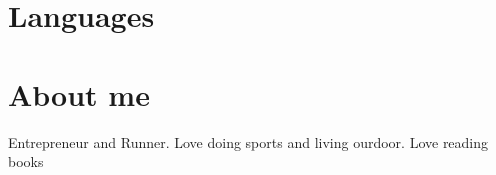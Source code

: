 \documentclass[11pt,a4paper,sans]{moderncv}        %
\begin{document}
\section{Languages}

\section{About me}
Entrepreneur and Runner. Love doing sports and living ourdoor. Love reading books

\vspace{1mm}

\end{document}
